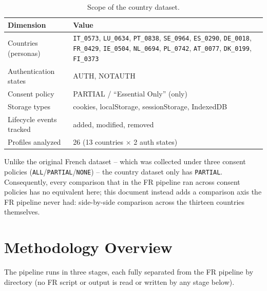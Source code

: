 \documentclass[11pt,a4paper]{article}
\newcommand{\code}[1]{\texttt{#1}}
\begin{document}
\begin{table}[h]
\centering
\caption{Scope of the country dataset.}
\begin{tabular}{lp{10.5cm}}
\toprule
Dimension & Value \\
\midrule
Countries (personas) & \code{IT\_0573}, \code{LU\_0634}, \code{PT\_0838}, \code{SE\_0964}, \code{ES\_0290}, \code{DE\_0018}, \code{FR\_0429}, \code{IE\_0504}, \code{NL\_0694}, \code{PL\_0742}, \code{AT\_0077}, \code{DK\_0199}, \code{FI\_0373} \\
Authentication states & AUTH, NOTAUTH \\
Consent policy & PARTIAL / ``Essential Only'' (only) \\
Storage types & cookies, localStorage, sessionStorage, IndexedDB \\
Lifecycle events tracked & added, modified, removed \\
Profiles analyzed & 26 (13 countries $\times$ 2 auth states) \\
\bottomrule
\end{tabular}
\end{table}

Unlike the original French dataset -- which was collected under three consent
policies (\code{ALL}/\code{PARTIAL}/\code{NONE}) -- the country dataset only
has \code{PARTIAL}. Consequently, every comparison that in the FR pipeline ran
across consent policies has no equivalent here; this document instead adds a
comparison axis the FR pipeline never had: side-by-side comparison across the
thirteen countries themselves.

\section{Methodology Overview}

The pipeline runs in three stages, each fully separated from the FR pipeline
by directory (no FR script or output is read or written by any stage below).
\end{document}
